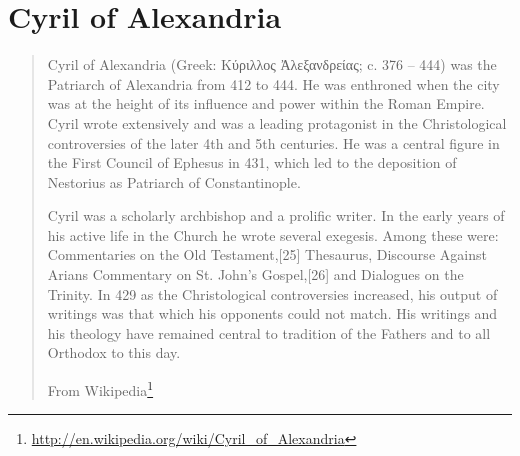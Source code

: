 \documentclass[12pt,letterpaper,twoside,final]{memoir}
\begin{document}
\section{Cyril of Alexandria}
\blockquote[From Wikipedia\footnote{\url{http://en.wikipedia.org/wiki/Cyril_of_Alexandria}}]{Cyril of Alexandria (Greek: Κύριλλος Ἀλεξανδρείας; c. 376 – 444) was the Patriarch of Alexandria from 412 to 444. He was enthroned when the city was at the height of its influence and power within the Roman Empire. Cyril wrote extensively and was a leading protagonist in the Christological controversies of the later 4th and 5th centuries. He was a central figure in the First Council of Ephesus in 431, which led to the deposition of Nestorius as Patriarch of Constantinople.

Cyril was a scholarly archbishop and a prolific writer. In the early years of his active life in the Church he wrote several exegesis. Among these were: Commentaries on the Old Testament,[25] Thesaurus, Discourse Against Arians Commentary on St. John's Gospel,[26] and Dialogues on the Trinity. In 429 as the Christological controversies increased, his output of writings was that which his opponents could not match. His writings and his theology have remained central to tradition of the Fathers and to all Orthodox to this day.}
\end{document}
